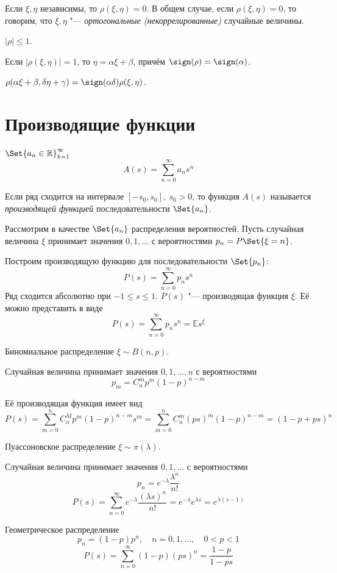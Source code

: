 \begin{props}
\item Если $ \xi, \eta $ независимы, то $ \rho(\xi, \eta) = 0 $.
	В общем случае, если $ \rho(\xi, \eta) = 0 $, то говорим, что $ \xi, \eta $ "---
	\emph{ортогональные (некоррелированные)} случайные величины.
\item $ |\rho| \le 1 $.
\item Если $ |\rho(\xi, \eta)| = 1 $, то $ \eta = \alpha\xi + \beta $, причём
	$ \sign(\rho) = \sign(\alpha) $.
\item $ \rho(\alpha \xi + \beta, \delta \eta + \gamma) = \sign(\alpha \delta) \rho(\xi, \eta) $.
\end{props}

\section{Производящие функции}

\begin{definition}
	$ \Set{a_n \in \mathbb R}_{k = 1}^\infty $
	$$ A(s) = \sum_{n = 0}^\infty a_ns^n $$

	Если ряд сходится на интервале $ [-s_0, s_0], ~ s_0 > 0 $, то функция $ A(s) $ называется
	\emph{производящей функцией} последовательности $ \Set{a_n} $.
\end{definition}

Рассмотрим в качестве $ \Set{a_n} $ распределения вероятностей.
Пусть случайная величина $ \xi $ принимает значения $ 0, 1, \dotsc $ с вероятностями
$ p_n = P\Set{\xi = n} $.

Построим производящую функцию для последовательности $ \Set{p_n} $:
$$ P(s) = \sum_{n = 0}^\infty p_ns^n $$
Ряд сходится абсолютно при $ -1 \le s \le 1 $.
$ P(s) $ "--- производящая функция $ \xi $.
Её можно представить в виде
$$ P(s) = \sum_{n = 0}^\infty p_ns^n = \mathbb Es^\xi $$

\begin{exmpls}
\item Биномиальное распределение $ \xi \sim B(n, p) $.

	Случайная величина принимает значения $ 0, 1, \dots, n $ с вероятностями
	$$ p_m = C_n^m p^m(1 - p)^{n - m} $$
	
	Её производящая функция имеет вид
	$$ P(s) = \sum_{m = 0}^n C_n^M p^m(1 - p)^{n - m}s^m =
	\sum_{m = 0}^n C_n^m (ps)^m (1 - p)^{n - m} = (1 - p + ps)^n $$
\item Пуассоновское распределение $ \xi \sim \pi(\lambda) $.

	Случайная величина принимает значения $ 0, 1, \dotsc $ с вероятностями
	$$ p_n = e^{-\lambda} \frac{\lambda^n}{n!} $$
	$$ P(s) = \sum_{n = 0}^\infty e^{-\lambda} \frac{(\lambda s)^n}{n!} =
	e^{-\lambda}e^{\lambda s} = e^{\lambda (s - 1)} $$
\item Геометрическое распределение
	$$ p_n = (1 - p)p^n, \quad n = 0, 1, \dots, \quad 0 < p < 1 $$
	$$ P(s) = \sum_{n = 0}^\infty (1 - p)(ps)^n = \frac{1 - p}{1 - ps} $$
\end{exmpls}

